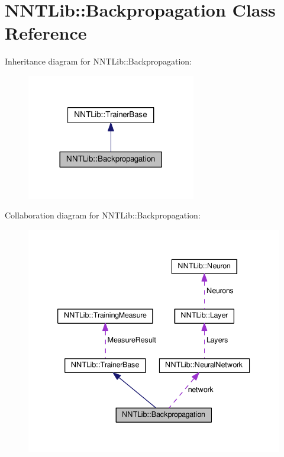 \hypertarget{class_n_n_t_lib_1_1_backpropagation}{}\section{N\+N\+T\+Lib\+:\+:Backpropagation Class Reference}
\label{class_n_n_t_lib_1_1_backpropagation}


Inheritance diagram for N\+N\+T\+Lib\+:\+:Backpropagation\+:\nopagebreak
\begin{figure}[H]
\begin{center}
\leavevmode
\includegraphics[width=209pt]{class_n_n_t_lib_1_1_backpropagation__inherit__graph}
\end{center}
\end{figure}


Collaboration diagram for N\+N\+T\+Lib\+:\+:Backpropagation\+:\nopagebreak
\begin{figure}[H]
\begin{center}
\leavevmode
\includegraphics[width=339pt]{class_n_n_t_lib_1_1_backpropagation__coll__graph}
\end{center}
\end{figure}
